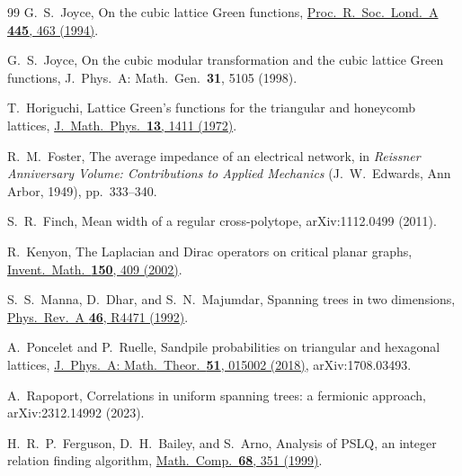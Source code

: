 \documentclass[aps,pra,10pt,twocolumn,superscriptaddress,nofootinbib]{revtex4-2}
\begin{document}
\begin{thebibliography}{99}
G.~S.~Joyce,
On the cubic lattice Green functions,
\href{https://doi.org/10.1098/rspa.1994.0072}{Proc.\ R.\ Soc.\ Lond.\ A \textbf{445}, 463 (1994)}.

G.~S.~Joyce,
On the cubic modular transformation and the cubic lattice Green functions,
J.\ Phys.\ A: Math.\ Gen.\ \textbf{31}, 5105 (1998).

T.~Horiguchi,
Lattice Green's functions for the triangular and honeycomb lattices,
\href{https://doi.org/10.1063/1.1666155}{J.\ Math.\ Phys.\ \textbf{13}, 1411 (1972)}.

R.~M.~Foster,
The average impedance of an electrical network,
in \emph{Reissner Anniversary Volume: Contributions to Applied Mechanics}
(J.~W.~Edwards, Ann Arbor, 1949), pp.~333--340.

S.~R.~Finch,
Mean width of a regular cross-polytope,
arXiv:1112.0499 (2011).

R.~Kenyon,
The Laplacian and Dirac operators on critical planar graphs,
\href{https://doi.org/10.1007/s00222-002-0249-4}{Invent.\ Math.\ \textbf{150}, 409 (2002)}.

S.~S.~Manna, D.~Dhar, and S.~N.~Majumdar,
Spanning trees in two dimensions,
\href{https://doi.org/10.1103/PhysRevA.46.R4471}{Phys.\ Rev.\ A \textbf{46}, R4471 (1992)}.

A.~Poncelet and P.~Ruelle,
Sandpile probabilities on triangular and hexagonal lattices,
\href{https://doi.org/10.1088/1751-8121/aa9255}{J.\ Phys.\ A: Math.\ Theor.\ \textbf{51}, 015002 (2018)},
arXiv:1708.03493.

A.~Rapoport,
Correlations in uniform spanning trees: a fermionic approach,
arXiv:2312.14992 (2023).

H.~R.~P.~Ferguson, D.~H.~Bailey, and S.~Arno,
Analysis of PSLQ, an integer relation finding algorithm,
\href{https://doi.org/10.1090/S0025-5718-99-00995-3}{Math.\ Comp.\ \textbf{68}, 351 (1999)}.

\end{thebibliography}
\end{document}
